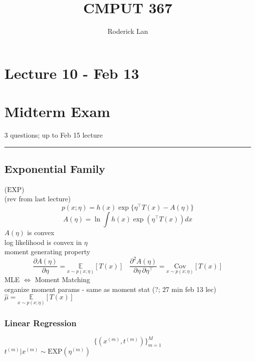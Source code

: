 \documentclass{article}
\title{CMPUT 367}
\author{Roderick Lan}
\date{}
\begin{document}
\maketitle

\tableofcontents
\break

\section*{Lecture 10 - Feb 13}
\section{Midterm Exam}
3 questions; up to Feb 15 lecture
\\
\noindent\rule{\textwidth}{0.5pt}

\subsection{Exponential Family}
($\mathrm{EXP}$)\\
(rev from last lecture)
\[
    p(x;\eta) = h(x) \exp \{ \eta ^\top T(x) - A(\eta) \}
\]
\[
    A(\eta) = \ln \int h(x)\exp (\eta ^\top T(x))dx
\]
$A(\eta)$ is convex
\\
log likelihood is convex in $\eta$
\\
moment generating property
\[
    \frac{\partial A(\eta)}{\partial \eta} = \underset{x\sim p(x; \eta)}{\mathbb E}[T(x)]
    \ \ \ \ 
    \frac{\partial^2 A(\eta)}{\partial \eta \ \partial \eta^\top}=
    \underset{x \sim p(x; \eta)}{\mathrm{Cov}}[T(x)]
\]
\noindent
MLE $\iff$ Moment Matching \\
organize moment params - same as moment stat (?; 27 min feb 13 lec)\\
$\hat \mu= \underset{x\sim p(x; \eta)}{\mathbb E}[T(x)]$

\subsubsection{Linear Regression}
\[
    \{(x^{(m)}, t^{(m)}) \} _{m=1}^M
\]
$t^{(m)} | x^{(m)} \sim \mathrm{EXP} (\eta^{(m)})$






\end{document}
